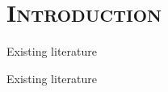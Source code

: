 \documentclass[xcolor=x11names,compress]{beamer}
\begin{document}
\section{\scshape Introduction}
{
    \begin{frame}[t]{Existing literature}
        \vspace*{-0.3cm}
        \begin{minipage}[t]{\textwidth}
            
        \end{minipage}
    \end{frame}}

{
    \begin{frame}[t]{Existing literature}
        \vspace*{-0.3cm}
        \begin{minipage}[t]{\textwidth}
            
        \end{minipage}
    \end{frame}}
\end{document}
